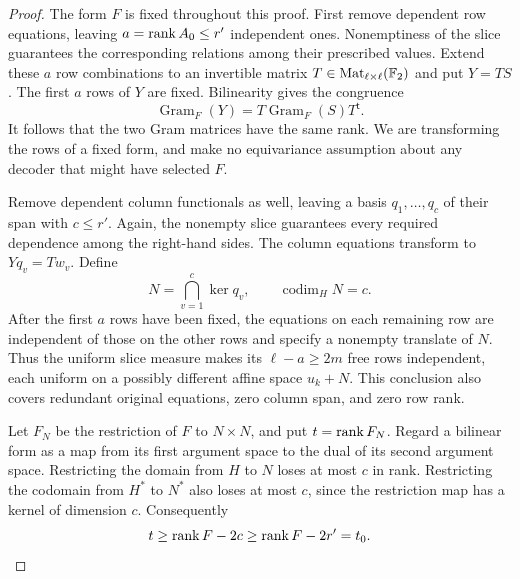 \begin{proof}
The form $F$ is fixed throughout this proof.  First remove dependent
row equations, leaving $a=\operatorname{rank} A_0\leq r'$ independent ones.
Nonemptiness of the slice guarantees the corresponding relations among
their prescribed values.  Extend these $a$ row combinations to an
invertible matrix $T\in\operatorname{Mat}_{\ell\times\ell}(\mathbb F_2)$ and put $Y=TS$.
The first $a$ rows of $Y$ are fixed.  Bilinearity gives the congruence
\begin{equation}\label{eq:lower-gram-congruence}
 \operatorname{Gram}_F(Y)
       =T\operatorname{Gram}_F(S)T^{\mathsf t}.
\end{equation}
It follows that the two Gram matrices have the same rank.  We are
transforming the rows of a fixed form, and make no equivariance
assumption about any decoder that might have selected $F$.

Remove dependent column functionals as well, leaving a basis
$q_1,\ldots,q_c$ of their span with $c\leq r'$.  Again, the nonempty
slice guarantees every required dependence among the right-hand sides.
The column equations transform to $Yq_v=Tw_v$.  Define
\[
 N=\bigcap_{v=1}^c\ker q_v,\qquad \operatorname{codim}_H N=c.
\]
After the first $a$ rows have been fixed, the equations on each remaining
row are independent of those on the other rows and specify a nonempty
translate of $N$.  Thus the uniform slice measure makes its
$\ell-a\geq2m$ free rows independent, each uniform on a possibly
different affine space $u_k+N$.  This conclusion also covers redundant
original equations, zero column span, and zero row rank.

Let $F_N$ be the restriction of $F$ to $N\times N$, and put
$t=\operatorname{rank} F_N$.  Regard a bilinear form as a map from its first argument
space to the dual of its second argument space.  Restricting the
domain from $H$ to $N$ loses at most $c$ in rank.  Restricting the
codomain from $H^*$ to $N^*$ also loses at most $c$, since the restriction
map has a kernel of dimension $c$.  Consequently
\begin{equation}\label{eq:lower-rank-loss}
 t\geq\operatorname{rank} F-2c\geq\operatorname{rank} F-2r'=t_0.
\end{equation}


\end{proof}
